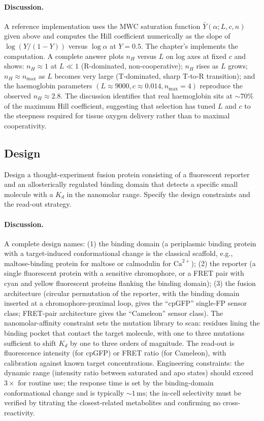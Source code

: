 \paragraph{Discussion.}
A reference implementation uses the MWC saturation function
$\bar Y(\alpha; L, c, n)$ given above and computes the Hill
coefficient numerically as the slope of $\log(Y/(1-Y))$ versus
$\log \alpha$ at $Y = 0.5$. The chapter's 
implements the computation. A complete answer plots $n_H$ versus $L$
on log axes at fixed $c$ and shows: $n_H \approx 1$ at $L \ll 1$
(R-dominated, non-cooperative); $n_H$ rises as $L$ grows; $n_H
\approx n_{\max}$ as $L$ becomes very large (T-dominated, sharp
T-to-R transition); and the haemoglobin parameters $(L \approx 9000,
c \approx 0.014, n_{\max} = 4)$ reproduce the observed $n_H \approx
2.8$. The discussion identifies that real haemoglobin sits at
$\sim 70\%$ of the maximum Hill coefficient, suggesting that selection
has tuned $L$ and $c$ to the steepness required for tissue oxygen
delivery rather than to maximal cooperativity.

\subsection*{Design}

\begin{exercise}
Design a thought-experiment fusion protein consisting of a
fluorescent reporter and an allosterically regulated binding domain
that detects a specific small molecule with a $K_d$ in the
nanomolar range. Specify the design constraints and the read-out
strategy.
\end{exercise}

\paragraph{Discussion.}
A complete design names: (1) the binding domain (a periplasmic
binding protein with a target-induced conformational change is the
classical scaffold, e.g., maltose-binding protein for maltose or
calmodulin for $\text{Ca}^{2+}$); (2) the reporter (a single
fluorescent protein with a sensitive chromophore, or a FRET pair
with cyan and yellow fluorescent proteins flanking the binding
domain); (3) the fusion architecture (circular permutation of the
reporter, with the binding domain inserted at a chromophore-proximal
loop, gives the ``cpGFP'' single-FP sensor class; FRET-pair
architecture gives the ``Cameleon'' sensor class). The
nanomolar-affinity constraint sets the mutation library to scan:
residues lining the binding pocket that contact the target molecule,
with one to three mutations sufficient to shift $K_d$ by one to
three orders of magnitude. The read-out is fluorescence intensity
(for cpGFP) or FRET ratio (for Cameleon), with calibration against
known target concentrations. Engineering constraints: the dynamic
range (intensity ratio between saturated and apo states) should
exceed $3\times$ for routine use; the response time is set by the
binding-domain conformational change and is typically
$\sim 1\,\text{ms}$; the in-cell selectivity must be verified by
titrating the closest-related metabolites and confirming no
cross-reactivity.

